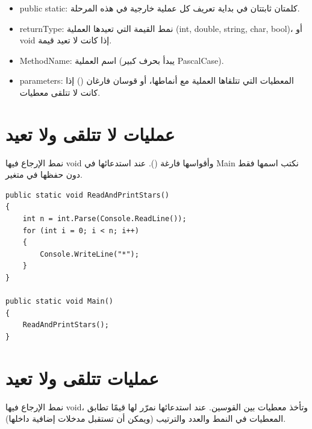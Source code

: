 \documentclass[14pt]{extarticle}
\begin{document}
\begin{itemize}[nosep]
    \item \textenglish{public static}: كلمتان ثابتتان في بداية تعريف كل عملية خارجية في هذه المرحلة.
    \item \textenglish{returnType}: نمط القيمة التي تعيدها العملية (\textenglish{int, double, string, char, bool})، أو \textenglish{void} إذا كانت لا تعيد قيمة.
    \item \textenglish{MethodName}: اسم العملية (يبدأ بحرف كبير \textenglish{PascalCase}).
    \item \textenglish{parameters}: المعطيات التي تتلقاها العملية مع أنماطها، أو قوسان فارغان \textenglish{()} إذا كانت لا تتلقى معطيات.
\end{itemize}

\filbreak
\section{عمليات لا تتلقى ولا تعيد}
نمط الإرجاع فيها \textenglish{void} وأقواسها فارغة \textenglish{()}. عند استدعائها في \textenglish{Main} نكتب اسمها فقط دون حفظها في متغير.

\begin{boxExample}
\begin{english}
\begin{verbatim}
public static void ReadAndPrintStars()
{
    int n = int.Parse(Console.ReadLine());
    for (int i = 0; i < n; i++)
    {
        Console.WriteLine("*");
    }
}

public static void Main()
{
    ReadAndPrintStars();
}
\end{verbatim}
\end{english}
\end{boxExample}

\filbreak
\section{عمليات تتلقى ولا تعيد}
نمط الإرجاع فيها \textenglish{void}، وتأخذ معطيات بين القوسين. عند استدعائها نمرّر لها قيمًا تطابق المعطيات في النمط والعدد والترتيب (ويمكن أن تستقبل مدخلات إضافية داخلها).
\end{document}
